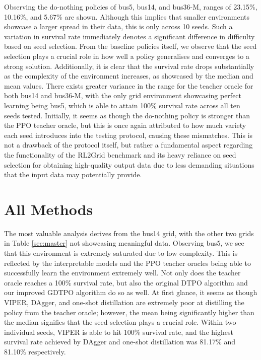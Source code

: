 Observing the do-nothing policies of bus5, bus14, and bus36-M, ranges of 23.15\%, 10.16\%, and 5.67\% are shown. Although this implies that smaller environments showcase a larger spread in their data, this is only across 10 seeds. Such a variation in survival rate immediately denotes a significant difference in difficulty based on seed selection. From the baseline policies itself, we observe that the seed selection plays a crucial role in how well a policy generalises and converges to a strong solution. Additionally, it is clear that the survival rate drops substantially as the complexity of the environment increases, as showcased by the median and mean values. There exists greater variance in the range for the teacher oracle for both bus14 and bus36-M, with the only grid environment showcasing perfect learning being bus5, which is able to attain 100\% survival rate across all ten seeds tested. Initially, it seems as though the do-nothing policy is stronger than the PPO teacher oracle, but this is once again attributed to how much variety each seed introduces into the testing protocol, causing these mismatches. This is not a drawback of the protocol itself, but rather a fundamental aspect regarding the functionality of the RL2Grid benchmark and its heavy reliance on seed selection for obtaining high-quality output data due to less demanding situations that the input data may potentially provide.

\section{All Methods}

The most valuable analysis derives from the bus14 grid, with the other two grids in Table \ref{sec:master} not showcasing meaningful data. Observing bus5, we see that this environment is extremely saturated due to low complexity. This is reflected by the interpretable models and the PPO teacher oracles being able to successfully learn the environment extremely well. Not only does the teacher oracle reaches a 100\% survival rate, but also the original DTPO algorithm and our improved GDTPO algorithm do so as well. At first glance, it seems as though VIPER, DAgger, and one-shot distillation are extremely poor at distilling the policy from the teacher oracle; however, the mean being significantly higher than the median signifies that the seed selection plays a crucial role. Within two individual seeds, VIPER is able to hit 100\% survival rate, and the highest survival rate achieved by DAgger and one-shot distillation was 81.17\% and 81.10\% respectively.

